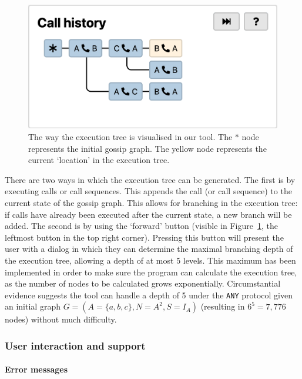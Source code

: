 \begin{figure}[htb!]
    \includegraphics[width=\linewidth]{img/execution-tree.png}
    \caption{The way the execution tree is visualised in our tool. The \(*\) node represents the initial gossip graph. The yellow node represents the current `location' in the execution tree.}
    \label{fig:execution-tree}
\end{figure}

There are two ways in which the execution tree can be generated.
The first is by executing calls or call sequences.
This appends the call (or call sequence) to the current state of the gossip graph.
This allows for branching in the execution tree:
if calls have already been executed after the current state, a new branch will be added.
The second is by using the `forward' button (visible in Figure~\ref{fig:execution-tree}, the leftmost button in the top right corner).
Pressing this button will present the user with a dialog in which they can determine the maximal branching depth of the execution tree, allowing a depth of at most 5 levels.
This maximum has been implemented in order to make sure the program can calculate the execution tree, as the number of nodes to be calculated grows exponentially.
Circumstantial evidence suggests the tool can handle a depth of 5 under the \texttt{ANY} protocol given an initial graph \(G = (A = \{a, b, c\}, N = A^2, S = I_A)\) (resulting in \(6^5 = 7,776\) nodes) without much difficulty.

\subsubsection{User interaction and support}

\paragraph{Error messages}

